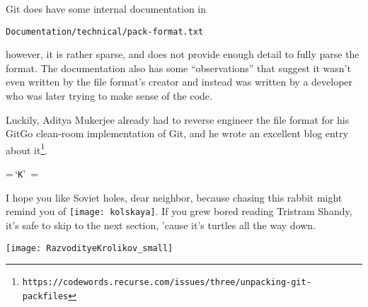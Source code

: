 \documentclass{article}
\begin{document}
Git does have some internal documentation in
\begin{center}
  \texttt{Documentation/technical/pack-format.txt}
\end{center}
however, it is rather sparse, and does not provide enough detail to
fully parse the format. The documentation also has some
``observations'' that suggest it wasn't even written by the file
format's creator and instead was written by a developer who was later
trying to make sense of the code.

Luckily, Aditya Mukerjee already had to reverse engineer the file
format for his GitGo clean-room implementation of Git, and he wrote an
excellent blog entry about
it\footnote{\texttt{https://codewords.recurse.com/issues/three/unpacking-git-packfiles}}.

\begin{center}
{\small
\def\char#1{\,`\texttt{#1}'\,}
=\hbox{\char{K}}
\newdimen\bytewidth\bytewidth=
\def\byte#1{\hbox to \bytewidth{\hfil\texttt{#1}\hfil}}
\def\desc#1#2{\hbox to #1\bytewidth{\hfil #2\hfil}}
\def\underbrace#1{\draw [
    thick,
    decoration={
        brace,
        mirror,
        raise=2pt
    },
    decorate
] ([xshift=1pt]#1.base west) -- ([xshift=-1pt]#1.base east) 
node (#1label) [pos=0.5,anchor=north,yshift=-2pt]}
}
\end{center}

I hope you like Soviet holes, dear neighbor, because chasing this
rabbit might remind you of \texttt{[image: kolskaya]}. If you
grew bored reading Tristram Shandy, it's safe to skip to the next
section, 'cause it's turtles all the way down.

\begin{center}
\texttt{[image: RazvodityeKrolikov\_small]}
\end{center}
\end{document}
